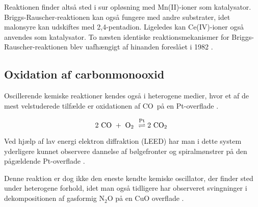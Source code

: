 Reaktionen finder alts{\aa} sted i sur opl{\o}sning med
Mn(II)-ioner som katalysator. Briggs-Rauscher-reaktionen
kan ogs{\aa} fungere med andre substrater, idet malonsyre
kan udskiftes med 2,4-pentadion. Ligeledes kan Ce(IV)-ioner
ogs{\aa} anvendes som katalysator. To n{\ae}sten identiske
reaktionsmekanismer for Briggs-Rauscher-reaktionen blev
uafh{\ae}ngigt af hinanden foresl{\aa}et i 1982
\cite{BriggsModel1,BriggsModel2}.

\subsection{Oxidation af carbonmonooxid}
{
\newcommand{\oxy}    {\mbox{O$_2$ }}
\newcommand{\coto}    {\mbox{CO$_2$ }}
\newcommand{\co}    {\mbox{CO }}
Oscillerende kemiske reaktioner kendes ogs{\aa} i
heterogene medier, hvor et af de mest velstuderede
tilf{\ae}lde er oxidationen af \co p{\aa} en Pt-overflade
\cite{CO-Oscillator}.

\begin{equation}
  2~\co +~\oxy \stackrel{{\rm Pt}}{\rightleftharpoons} 2~\coto
\end{equation}

Ved hj{\ae}lp af lav energi elektron diffraktion (LEED) har
man i dette system yderligere kunnet observere dannelse af
b{\o}lgefronter og spiralm{\o}nstrer p{\aa} den
p{\aa}g{\ae}ldende Pt-overflade \cite{CO-Oscillator}.

\vspace{4.0mm}
Denne reaktion er dog ikke den eneste kendte kemiske
oscillator, der finder sted under heterogene forhold, idet
man ogs{\aa} tidligere har observeret svingninger i
dekompositionen af gasformig N$_2$O p{\aa} en CuO overflade
\cite{Hugo}.
}

